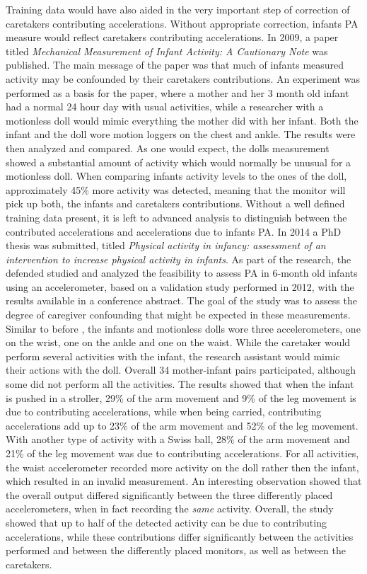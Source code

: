 \documentclass{article}
\begin{document}
{Training data would have also aided in the very important step of correction of caretakers contributing accelerations. Without appropriate correction, infants PA measure would reflect caretakers contributing accelerations. In 2009, a paper titled \textit{Mechanical Measurement of Infant Activity: A Cautionary Note} \cite{ref1} was published. The main message of the paper was that much of infants measured activity may be confounded by their caretakers contributions. An experiment was performed as a basis for the paper, where a mother and her 3 month old infant had a normal 24 hour day with usual activities, while a researcher with a motionless doll would mimic everything the mother did with her infant. Both the infant and the doll wore motion loggers on the chest and ankle. The results were then analyzed and compared. As one would expect, the dolls measurement showed a substantial amount of activity which would normally be unusual for a motionless doll. When comparing infants activity levels to the ones of the doll, approximately 45\% more activity was detected, meaning that the monitor will pick up both, the infants and caretakers contributions. Without a well defined training data present, it is left to advanced analysis to distinguish between the contributed accelerations and accelerations due to infants PA. In 2014 a PhD thesis was submitted, titled \textit{Physical activity in infancy: assessment of an intervention to increase physical activity in infants}\cite{ref6}. As part of the research, the defended studied and analyzed the feasibility to assess PA in 6-month old infants using an accelerometer, based on a validation study performed in 2012, with the results available in a conference abstract\cite{ref5}. The goal of the study was to assess the degree of caregiver confounding that might be expected in these measurements. Similar to before \cite{ref1}, the infants and motionless dolls wore three accelerometers, one on the wrist, one on the ankle and one on the waist. While the caretaker would perform several activities with the infant, the research assistant would mimic their actions with the doll. Overall 34 mother-infant pairs participated, although some did not perform all the activities. The results showed that when the infant is pushed in a stroller, 29\% of the arm movement and 9\% of the leg movement is due to contributing accelerations, while when being carried, contributing accelerations add up to 23\% of the arm movement and 52\% of the leg movement. With another type of activity with a Swiss ball, 28\% of the arm movement and 21\% of the leg movement was due to contributing accelerations. For all activities, the waist accelerometer recorded more activity on the doll rather then the infant, which resulted in an invalid measurement. An interesting observation showed that the overall output differed significantly between the three differently placed accelerometers, when in fact recording the \textit{same} activity. Overall, the study\cite{ref5} showed that up to half of the detected activity can be due to contributing accelerations, while these contributions differ significantly between the activities performed and between the differently placed monitors, as well as between the caretakers.\\\\
}
\end{document}
